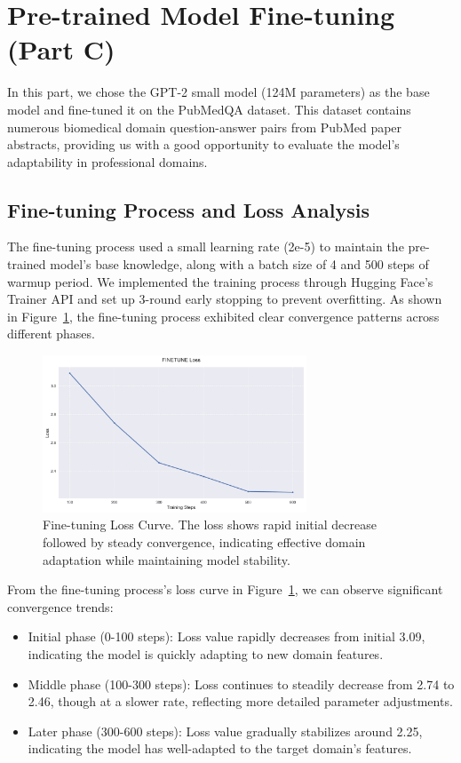 \documentclass[12pt,oneside]{article}
\begin{document}
\section{Pre-trained Model Fine-tuning (Part C)}

In this part, we chose the GPT-2 small model (124M parameters) as the base model and fine-tuned it on the PubMedQA dataset. This dataset contains numerous biomedical domain question-answer pairs from PubMed paper abstracts, providing us with a good opportunity to evaluate the model's adaptability in professional domains.

\subsection{Fine-tuning Process and Loss Analysis}

The fine-tuning process used a small learning rate (2e-5) to maintain the pre-trained model's base knowledge, along with a batch size of 4 and 500 steps of warmup period. We implemented the training process through Hugging Face's Trainer API and set up 3-round early stopping to prevent overfitting. As shown in Figure~\ref{fig:finetune_loss}, the fine-tuning process exhibited clear convergence patterns across different phases.

\begin{figure}[H]
    \centering
    \includegraphics[width=0.7\textwidth]{plots/C/finetune_loss.png}
    \caption{Fine-tuning Loss Curve. The loss shows rapid initial decrease followed by steady convergence, indicating effective domain adaptation while maintaining model stability.}
    \label{fig:finetune_loss}
\end{figure}

From the fine-tuning process's loss curve in Figure~\ref{fig:finetune_loss}, we can observe significant convergence trends:
\begin{itemize}
\item Initial phase (0-100 steps): Loss value rapidly decreases from initial 3.09, indicating the model is quickly adapting to new domain features.
\item Middle phase (100-300 steps): Loss continues to steadily decrease from 2.74 to 2.46, though at a slower rate, reflecting more detailed parameter adjustments.
\item Later phase (300-600 steps): Loss value gradually stabilizes around 2.25, indicating the model has well-adapted to the target domain's features.
\end{itemize}
\end{document}
